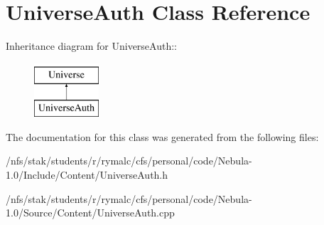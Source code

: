 \hypertarget{classUniverseAuth}{
\section{UniverseAuth Class Reference}
\label{classUniverseAuth}
}
Inheritance diagram for UniverseAuth::\begin{figure}[H]
\begin{center}
\leavevmode
\includegraphics[height=2cm]{classUniverseAuth}
\end{center}
\end{figure}


The documentation for this class was generated from the following files:\begin{DoxyCompactItemize}
\item 
/nfs/stak/students/r/rymalc/cfs/personal/code/Nebula-\/1.0/Include/Content/UniverseAuth.h\item 
/nfs/stak/students/r/rymalc/cfs/personal/code/Nebula-\/1.0/Source/Content/UniverseAuth.cpp\end{DoxyCompactItemize}
